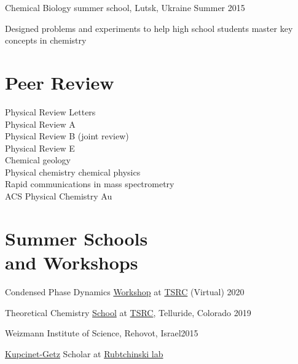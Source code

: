 \documentclass[margin,line]{res}
\newenvironment{list1}{
  \begin{list}{\ding{113}}{%
      \setlength{\itemsep}{0in}
      \setlength{\parsep}{0in} \setlength{\parskip}{0in}
      \setlength{\topsep}{0in} \setlength{\partopsep}{0in} 
      \setlength{\leftmargin}{0.17in}}}{\end{list}}
\begin{document}
\begin{resume}
Chemical Biology summer school, Lutsk, Ukraine \hfill{Summer 2015}

\begin{list1}
\item[]
Designed problems and experiments to help high school students master key concepts in chemistry
\end{list1}

\section{\sc Peer Review}
Physical Review Letters\\
Physical Review A\\
Physical Review B (joint review)\\
Physical Review E\\
Chemical geology\\ 
Physical chemistry chemical physics\\
Rapid communications in mass spectrometry\\
ACS Physical Chemistry Au

\section{\sc Summer Schools\\and Workshops}
%
%
Condensed Phase Dynamics  \href{https://meetings.telluridescience.org/meetings/workshop-details?wid=829}{Workshop} at \href{https://www.telluridescience.org/schools/tellurideschoolontheoreticalchemistry}{TSRC} (Virtual) \hfill {2020}

\vspace*{-2.5mm}

Theoretical Chemistry \href{https://meetings.telluridescience.org/meetings/workshop-details?wid=775}{School} at \href{https://www.telluridescience.org/schools/tellurideschoolontheoreticalchemistry}{TSRC}, Telluride, Colorado \hfill {2019}

\vspace*{-2.5mm}

Weizmann Institute of Science, Rehovot, Israel\hfill{2015}\\
\vspace*{-.1in}
\begin{list1}
\item[] \href{https://www.weizmann.ac.il/feinberg/admissions/kupcinet-getz-international-summer-school/about-program-0}{Kupcinet-Getz} Scholar at \href{https://www.weizmann.ac.il/Organic_Chemistry/Rybtchinski/}{Rubtchinski lab}
\end{list1}


\end{resume}
\end{document}

